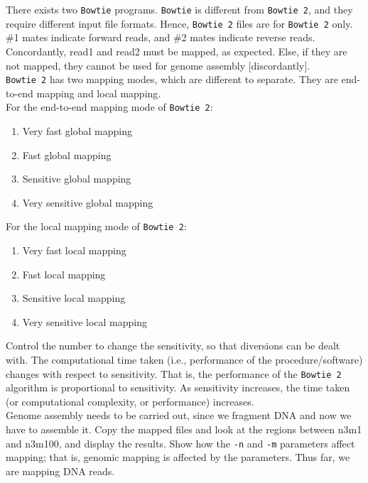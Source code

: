 There exists two {\tt Bowtie} programs. {\tt Bowtie} is different from {\tt Bowtie 2}, and they require different input file formats. Hence, {\tt Bowtie 2} files are for {\tt Bowtie 2} only. \#1 mates indicate forward reads, and \#2 mates indicate reverse reads. Concordantly, read1 and read2 must be mapped, as expected. Else, if they are not mapped, they cannot be used for genome assembly [discordantly]. \\

{\tt Bowtie 2} has two mapping modes, which are different to separate. They are end-to-end mapping and local mapping. \\

For the end-to-end mapping mode of {\tt Bowtie 2}: \vspace{-0.3cm}
\begin{enumerate} \itemsep -4pt
\item Very fast global mapping
\item Fast global mapping
\item Sensitive global mapping
\item Very sensitive global mapping
\end{enumerate}

For the local mapping mode of {\tt Bowtie 2}: \vspace{-0.3cm}
\begin{enumerate} \itemsep -4pt
\item Very fast local mapping
\item Fast local mapping
\item Sensitive local mapping
\item Very sensitive local mapping
\end{enumerate}

Control the number to change the sensitivity, so that diversions can be dealt with. The computational time taken (i.e., performance of the procedure/software) changes with respect to sensitivity. That is, the performance of the {\tt Bowtie 2} algorithm is proportional to sensitivity. As sensitivity increases, the time taken (or computational complexity, or performance) increases. \\

Genome assembly needs to be carried out, since we fragment DNA and now we have to assemble it. Copy the mapped files and look at the regions between n3m1 and n3m100, and display the results. Show how the {\tt -n} and {\tt -m} parameters affect mapping; that is, genomic mapping is affected by the parameters. Thus far, we are mapping DNA reads. \\

